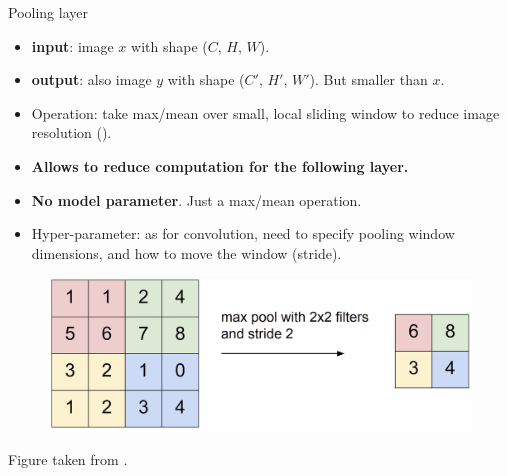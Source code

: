 
\begin{frame}{Pooling layer}
 \vspace{-4mm}
\begin{itemize}
\item \textbf{input}: image $x$ with shape ($C$, $H$, $W$).
\item  \textbf{output}: also image $y$ with shape ($C'$, $H'$, $W'$). But smaller than $x$.
\item Operation: take max/mean over small, local sliding window to reduce image resolution ().
\item \textbf{Allows to reduce computation for the following layer.}
\item \textbf{No model parameter}. Just a max/mean operation.
\item Hyper-parameter: as for convolution, need to specify pooling window dimensions, and how to move the window (stride).
\end{itemize}
\begin{figure}
                        \centering
                        \includegraphics[width=.65\linewidth]{./figures/max-pool-better.png}
\end{figure}
\scriptsize{Figure taken from .}
\end{frame}

